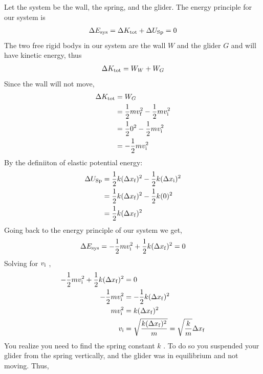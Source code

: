 \begin{Answer}
    Let the system be the wall, the spring, and the glider.  The energy
    principle for our system is
    \begin{align}
        \Delta E_{\mathrm{sys}} = \Delta K_{\mathrm{tot}} + \Delta U_\mathrm{Sp} = 0
    \end{align}
    The two free rigid bodys in our system are the wall
    $
        W
    $ and the glider
    $
        G
    $ and will have kinetic energy, thus
    \begin{align}
        \Delta K_{\mathrm{tot}} = W_W + W_G
    \end{align}
    Since the wall will not move,
    \begin{align}
        \Delta K_{\mathrm{tot}} &= W_G \\
        &= \frac{1}{2}mv_{\mathrm{f}}^2 - \frac{1}{2}mv_{\mathrm{i}}^2 \\
        &= \frac{1}{2}0^2 - \frac{1}{2}mv_{\mathrm{i}}^2 \\
        &= -\frac{1}{2}mv_{\mathrm{i}}^2
    \end{align}
    By the definiiton of elastic potential energy:
    \begin{align}
        \Delta U_\mathrm{Sp} &= \frac{1}{2}k(\Delta x_{\mathrm{f}})^2 - \frac{1}
        {2}k(\Delta x_{\mathrm{i}})^2 \\
        &= \frac{1}{2}k(\Delta x_{\mathrm{f}})^2 - \frac{1} {2}k(0)^2 \\
        &= \frac{1}{2}k(\Delta x_{\mathrm{f}})^2
    \end{align}
    Going back to the energy principle of our system we get,
    \begin{equation}
        \Delta E_{\mathrm{sys}} = -\frac{1}{2}mv_{\mathrm{i}}^2 + \frac{1}{2}k(\Delta x_{\mathrm{f}})^2
        = 0
    \end{equation}
    Solving for
    $
        v_{\mathrm{i}}
    $%
    ,
    \begin{align}
        -\frac{1}{2}mv_{\mathrm{i}}^2 + \frac{1}{2}k(\Delta x_{\mathrm{f}})^2 &= 0 \\
        -\frac{1}{2}mv_{\mathrm{i}}^2 &= -\frac{1}{2}k(\Delta x_{\mathrm{f}})^2 \\
        mv_{\mathrm{i}}^2 &= k(\Delta x_{\mathrm{f}})^2 \\
        v_{\mathrm{i}} &= \sqrt{\frac{k(\Delta x_{\mathrm{f}})^2}{m}} = \sqrt{\frac{k}{m}}
        \Delta x_{\mathrm{f}}
    \end{align}
    You realize you need to find the spring constant
    $
        k
    $%
.    To do so you suspended your glider from the spring vertically, and
    the glider was in equilibrium and not moving.  Thus,
    \begin{equation}

\end{equation}
\end{Answer}
